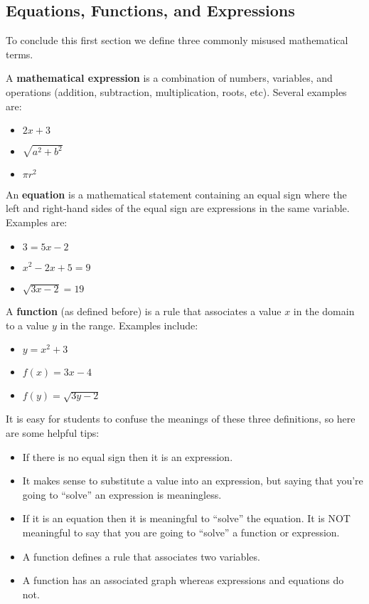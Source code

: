 


\subsection*{Equations, Functions, and Expressions}
To conclude this first section we define three commonly misused mathematical terms.
\begin{definition}
    A {\bf mathematical expression} is a combination of numbers, variables, and operations
    (addition, subtraction, multiplication, roots, etc).  Several examples are:
    \begin{itemize}
        \item $2x+3$
        \item $\sqrt{a^2 + b^2}$
        \item $\pi r^2$
    \end{itemize}
\end{definition}

\begin{definition}
    An {\bf equation} is a mathematical statement containing an equal sign where the left
    and right-hand sides of the equal sign are expressions in the same variable.  Examples
    are:
    \begin{itemize}
        \item $3=5x-2$
        \item $x^2-2x+5=9$
        \item $\sqrt{3x-2} = 19$
    \end{itemize}
\end{definition}

\begin{definition}
    A {\bf function} (as defined before) is a rule that associates a value $x$ in the
    domain to a value $y$ in the range.  Examples include:
    \begin{itemize}
        \item $y=x^2+3$
        \item $f(x) = 3x-4$
        \item $f(y) = \sqrt{3y-2}$
    \end{itemize}
\end{definition}

It is easy for students to confuse the meanings of these three definitions, so here are
some helpful tips:
\begin{itemize}
    \item If there is no equal sign then it is an expression.
    \item It makes sense to substitute a value into an expression, but saying that you're
        going to ``solve'' an expression is meaningless.
    \item If it is an equation then it is meaningful to ``solve'' the equation.  It is NOT
        meaningful to say that you are going to ``solve'' a function or expression.
    \item A function defines a rule that associates two variables.
    \item A function has an associated graph whereas expressions and equations do not.
\end{itemize}

